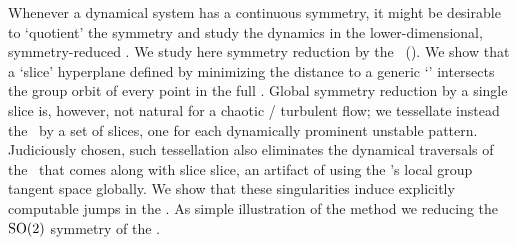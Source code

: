 
Whenever a dynamical system has a continuous symmetry, it might be
desirable to `quotient' the symmetry and study the dynamics in the
lower-dimensional, symmetry-reduced \statesp. We study here symmetry
reduction by the \mslices\ (\mframes). We show that a `slice' hyperplane
defined by minimizing the distance to a generic `{\template}' intersects the
group orbit of every point in the full {\statesp}. Global symmetry
reduction by a single slice is, however, not natural for a chaotic /
turbulent flow; we tessellate instead the \reducedsp\ by a set of slices,
one for each dynamically prominent unstable pattern. Judiciously chosen,
such tessellation also eliminates the dynamical traversals of the \sset\
that comes along with slice slice, an artifact of using the {\template}'s
local group tangent space globally. We show that these singularities
induce explicitly computable jumps in the \reducedsp. As simple
illustration of the method we reducing the $\textrm{SO}(2)$ symmetry of the
\cLe.

%
